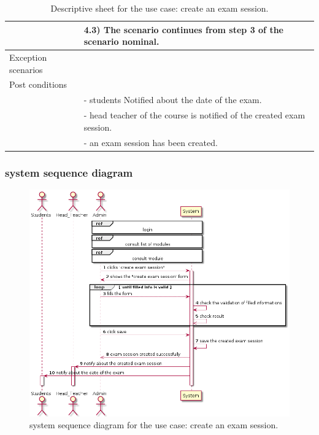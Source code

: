 \documentclass[]{uc2pfecaneva}
\begin{document}
\begin{table}[t]
\begin{tabularx}{\textwidth}{|l|X|}
		& \hspace{4mm}4.3) The scenario continues from step 3 of the scenario nominal.                                                                                      \\ \hline
		Exception scenarios   &                                                                                                                                                                   \\ \hline
		Post conditions       &                                                                                                                                                                   \\
		& - students Notified about the date of the exam.                                                                                                                   \\
		& - head teacher of the course is notified of the created exam session.                                                                                             \\
		& - an exam session has been created.                                                                                                                               \\ \hline
	\end{tabularx}
	\caption{Descriptive sheet for the use case: create an exam session.}
	\label{table:2}
\end{table}
\clearpage

\subsubsection{system sequence diagram}
\begin{figure}[h]
	
	\centering
	\includegraphics[width=\textwidth]{images/create_exam_session}
	
	\caption{system sequence diagram for the use case: create an exam session.}
\end{figure}
\clearpage
\end{document}
